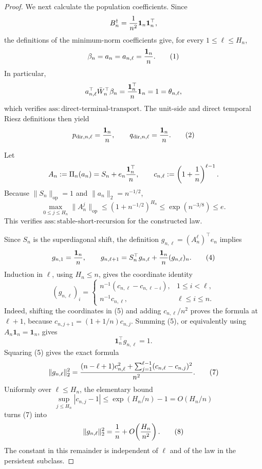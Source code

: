 \documentclass{article}
\begin{document}
\begin{proof}
We next calculate the population coefficients.  Since
\[
 B_n^\dagger={1\over n^2}\boldsymbol 1_n\boldsymbol 1_n^{\top},
\]
the definitions of the minimum-norm coefficients give, for every \(1\leq\ell\leq H_n\),
\[
 \beta_n=a_n=a_{n,\ell}={\boldsymbol 1_n\over n}.
 \tag{1}
\]
In particular,
\[
 a_{n,\ell}^{\top}\bar W_n^{\top}\beta_n
 ={\boldsymbol 1_n^{\top}\over n}\boldsymbol 1_n=1
 =\theta_{n,\ell},
\]
which verifies \(\mathrm{ass{:}direct\mbox{-}terminal\mbox{-}transport}\).  The unit-side and direct temporal Riesz definitions then yield
\[
 p_{\mathrm{dir},n,\ell}={\boldsymbol 1_n\over n},
 \qquad
 q_{\mathrm{dir},n,\ell}={\boldsymbol 1_n\over n}.
 \tag{2}
\]

Let
\[
 A_n:=\Pi_n(a_n)=S_n+e_n{\boldsymbol 1_n^{\top}\over n},
 \qquad
 c_{n,\ell}:=\left(1+{1\over n}\right)^{\ell-1}.
\]
Because \(\|S_n\|_{\mathrm{op}}=1\) and \(\|a_n\|_2=n^{-1/2}\),
\[
 \max_{0\leq j\leq H_n}\|A_n^j\|_{\mathrm{op}}
 \leq \left(1+n^{-1/2}\right)^{H_n}
 \leq \exp(n^{-3/8})\leq e.
 \tag{3}
\]
This verifies \(\mathrm{ass{:}stable\mbox{-}short\mbox{-}recursion}\) for the constructed law.

Since \(S_n\) is the superdiagonal shift, the definition \(g_{n,\ell}=(A_n^\ell)^{\top}e_n\) implies
\[
 g_{n,1}={\boldsymbol 1_n\over n},
 \qquad
 g_{n,\ell+1}=S_n^{\top}g_{n,\ell}
       +{\boldsymbol 1_n\over n}(g_{n,\ell})_n.
 \tag{4}
\]
Induction in \(\ell\), using \(H_n\leq n\), gives the coordinate identity
\[
 (g_{n,\ell})_i=
 \begin{cases}
 n^{-1}(c_{n,\ell}-c_{n,\ell-i}),&1\leq i<\ell,\\
 n^{-1}c_{n,\ell},&\ell\leq i\leq n.
 \end{cases}
 \tag{5}
\]
Indeed, shifting the coordinates in (5) and adding \(c_{n,\ell}/n^2\) proves the formula at \(\ell+1\), because \(c_{n,j+1}=(1+1/n)c_{n,j}\).  Summing (5), or equivalently using \(A_n\boldsymbol 1_n=\boldsymbol 1_n\), gives
\[
 \boldsymbol 1_n^{\top}g_{n,\ell}=1.
 \tag{6}
\]
Squaring (5) gives the exact formula
\[
 \|g_{n,\ell}\|_2^2
 ={(n-\ell+1)c_{n,\ell}^2
   +\sum_{j=1}^{\ell-1}(c_{n,\ell}-c_{n,j})^2\over n^2}.
 \tag{7}
\]
Uniformly over \(\ell\leq H_n\), the elementary bound
\[
 \sup_{j\leq H_n}|c_{n,j}-1|
 \leq \exp(H_n/n)-1=O(H_n/n)
\]
turns (7) into
\[
 \|g_{n,\ell}\|_2^2={1\over n}
       +O\!\left({H_n\over n^2}\right).
 \tag{8}
\]
The constant in this remainder is independent of \(\ell\) and of the law in the persistent subclass.


\end{proof}
\end{document}
